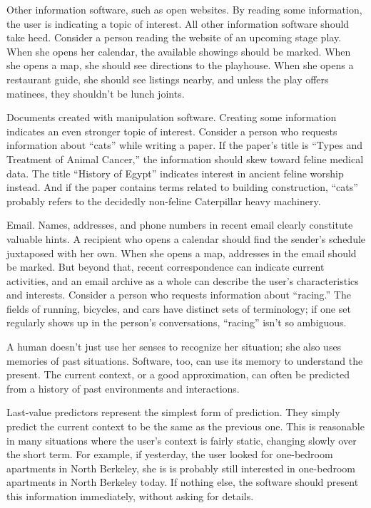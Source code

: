 {Other information software, such as open websites. By reading some information, the user is indicating a topic of interest. All other information software should take heed. Consider a person reading the website of an upcoming stage play. When she opens her calendar, the available showings should be marked. When she opens a map, she should see directions to the playhouse. When she opens a restaurant guide, she should see listings nearby, and unless the play offers matinees, they shouldn’t be lunch joints.

Documents created with manipulation software. Creating some information indicates an even stronger topic of interest. Consider a person who requests information about “cats” while writing a paper. If the paper’s title is “Types and Treatment of Animal Cancer,” the information should skew toward feline medical data. The title “History of Egypt” indicates interest in ancient feline worship instead. And if the paper contains terms related to building construction, “cats” probably refers to the decidedly non-feline Caterpillar heavy machinery.

Email. Names, addresses, and phone numbers in recent email clearly constitute valuable hints. A recipient who opens a calendar should find the sender’s schedule juxtaposed with her own. When she opens a map, addresses in the email should be marked. But beyond that, recent correspondence can indicate current activities, and an email archive as a whole can describe the user’s characteristics and interests. Consider a person who requests information about “racing.” The fields of running, bicycles, and cars have distinct sets of terminology; if one set regularly shows up in the person’s conversations, “racing” isn’t so ambiguous.

A human doesn’t just use her senses to recognize her situation; she also uses memories of past situations. Software, too, can use its memory to understand the present. The current context, or a good approximation, can often be predicted from a history of past environments and interactions.

Last-value predictors represent the simplest form of prediction. They simply predict the current context to be the same as the previous one. This is reasonable in many situations where the user’s context is fairly static, changing slowly over the short term. For example, if yesterday, the user looked for one-bedroom apartments in North Berkeley, she is is probably still interested in one-bedroom apartments in North Berkeley today. If nothing else, the software should present this information immediately, without asking for details.

}
